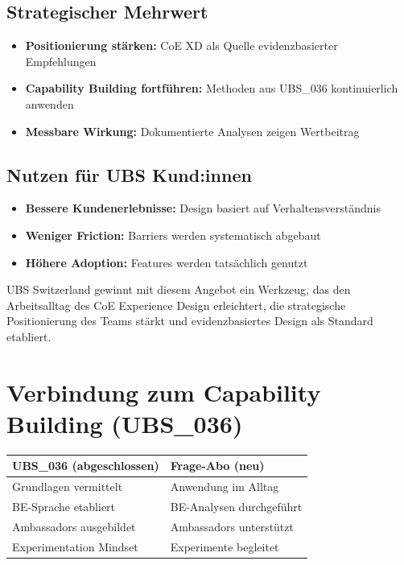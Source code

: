 \documentclass[11pt,a4paper]{article}
\newcommand{\fahead}[1]{\textcolor{fawhite}{\bfseries #1}}
\begin{document}
\subsection{Strategischer Mehrwert}

\begin{itemize}
    \item[$\checkmark$] \textbf{Positionierung stärken:} CoE XD als Quelle evidenzbasierter Empfehlungen
    \item[$\checkmark$] \textbf{Capability Building fortführen:} Methoden aus UBS\_036 kontinuierlich anwenden
    \item[$\checkmark$] \textbf{Messbare Wirkung:} Dokumentierte Analysen zeigen Wertbeitrag
\end{itemize}

\subsection{Nutzen für UBS Kund:innen}

\begin{itemize}
    \item[$\checkmark$] \textbf{Bessere Kundenerlebnisse:} Design basiert auf Verhaltensverständnis
    \item[$\checkmark$] \textbf{Weniger Friction:} Barriers werden systematisch abgebaut
    \item[$\checkmark$] \textbf{Höhere Adoption:} Features werden tatsächlich genutzt
\end{itemize}

\begin{fasuccessbox}[Zusammenfassung]
UBS Switzerland gewinnt mit diesem Angebot ein Werkzeug, das den Arbeitsalltag des CoE Experience Design erleichtert, die strategische Positionierung des Teams stärkt und evidenzbasiertes Design als Standard etabliert.
\end{fasuccessbox}

\newpage
\appendix
\section{Verbindung zum Capability Building (UBS\_036)}

\begin{center}
\begin{tabular}{p{6cm}p{6cm}}
\toprule
\rowcolor{fadarkblue}
\fahead{UBS\_036 (abgeschlossen)} & \fahead{Frage-Abo (neu)} \\
\midrule
\rowcolor{fawhite}
Grundlagen vermittelt & Anwendung im Alltag \\
\rowcolor{falightgray}
BE-Sprache etabliert & BE-Analysen durchgeführt \\
\rowcolor{fawhite}
Ambassadors ausgebildet & Ambassadors unterstützt \\
\rowcolor{falightgray}
Experimentation Mindset & Experimente begleitet \\
\bottomrule
\end{tabular}
\end{center}
\end{document}
